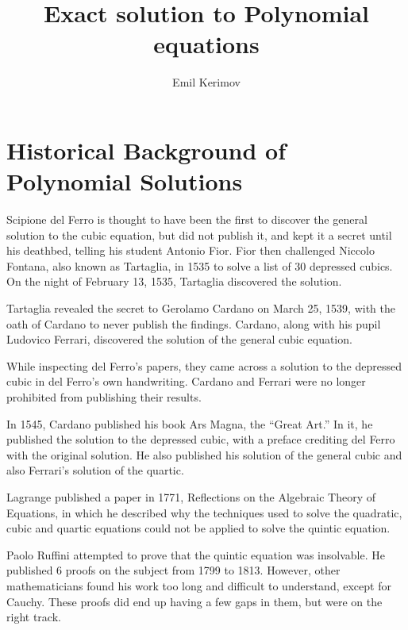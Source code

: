 \documentclass[a4paper]{article}
\title{Exact solution to Polynomial equations}
\author{Emil Kerimov}
\date{}
\begin{document}
\maketitle

\section{Historical Background of Polynomial Solutions}\label{eps:sec:history}

Scipione del Ferro is thought to have been the first to discover the general solution to the cubic equation, but did not publish it, and kept it a secret until his deathbed, telling his student Antonio Fior.
Fior then challenged Niccolo Fontana, also known as Tartaglia, in 1535 to solve a list of 30 depressed cubics.
On the night of February 13, 1535, Tartaglia discovered the solution.

\bigskip

Tartaglia revealed the secret to
Gerolamo Cardano on March 25, 1539, with the oath
of Cardano to never publish the findings.
Cardano, along with his pupil Ludovico Ferrari, discovered the solution of the general cubic equation.

While inspecting del Ferro's papers, they
came across a solution to the depressed cubic in del Ferro's own handwriting.
Cardano and Ferrari were no longer prohibited from publishing their results.

\bigskip

In 1545, Cardano published his book Ars
Magna, the \textquotedblleft Great Art.\textquotedblright
In it, he published the solution to the
depressed cubic, with a preface crediting
del Ferro with the original solution.
He also published his solution of the
general cubic and also Ferrari's solution of
the quartic.

\bigskip

Lagrange published a paper in 1771, Reflections on the Algebraic Theory of Equations, in which he described why the techniques used to solve the quadratic, cubic and quartic equations could not be applied to solve the quintic equation.

\bigskip

Paolo Ruffini attempted to prove that the quintic equation was insolvable.
He published 6 proofs on the subject from 1799 to 1813.
However, other mathematicians found his work too long and difficult to understand, except for Cauchy.
These proofs did end up having a few gaps in them, but were on the right track.
\end{document}
